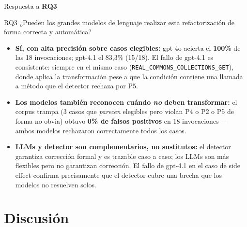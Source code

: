 \documentclass[aspectratio=169, 10pt]{beamer}
\newcommand{\ok}[1]{\textcolor{okgreen}{\textbf{#1}}}
\newcommand{\rq}[1]{\textbf{RQ#1}}
\begin{document}
\begin{frame}{Respuesta a \rq{3}}
  \begin{block}{RQ3}
    ¿Pueden los grandes modelos de lenguaje realizar esta refactorización
    de forma correcta y automática?
  \end{block}

  \vspace{0.4em}
  \begin{itemize}
    \item \textbf{Sí, con alta precisión sobre casos elegibles:}
          gpt-4o acierta el \ok{100\%} de las 18 invocaciones; gpt-4.1
          el 83,3\% (15/18). El fallo de gpt-4.1 es consistente: siempre
          en el mismo caso (\texttt{REAL\_COMMONS\_COLLECTIONS\_GET}),
          donde aplica la transformación pese a que la condición contiene
          una llamada a método que el detector rechaza por P5.

    \item \textbf{Los modelos también reconocen cuándo \emph{no} deben
          transformar:} el corpus trampa (3 casos que \emph{parecen}
          elegibles pero violan P4 o P2 o P5 de forma no obvia) obtuvo
          \ok{0\% de falsos positivos} en 18 invocaciones --- ambos modelos
          rechazaron correctamente todos los casos.

    \item \textbf{LLMs y detector son complementarios, no sustitutos:}
          el detector garantiza corrección formal y es trazable caso a caso;
          los LLMs son más flexibles pero no garantizan corrección. El fallo
          de gpt-4.1 en el caso de side effect confirma precisamente que
          el detector cubre una brecha que los modelos no resuelven solos.
  \end{itemize}
\end{frame}

\section{Discusión}
\end{document}

